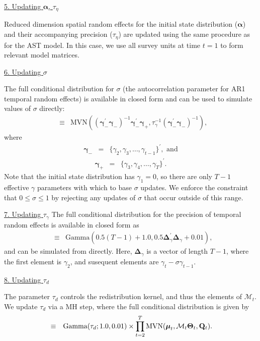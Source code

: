 \documentclass[12pt,fleqn]{article}
\begin{document}
\begin{flushleft}
\underline{5. Updating $\boldsymbol{\alpha}$, $\tau_\eta$}

Reduced dimension spatial random effects for the initial state distribution ($\boldsymbol{\alpha}$) and their accompanying precision ($\tau_\eta$) are updated using the same procedure as for the AST model.  In this case, we use all survey units at time $t=1$ to form relevant model matrices.

\underline{6. Updating $\sigma$}

The full conditional distribution for $\sigma$ (the autocorrelation parameter for AR1 temporal random effects) is available in closed form and can be used to simulate values of $\sigma$ directly:
\begin{eqnarray*}
  [\sigma | \cdot] & \equiv & \textrm{MVN}( (\boldsymbol{\gamma}_-^\prime \boldsymbol{\gamma}_-)^{-1} \boldsymbol{\gamma}_-^\prime \boldsymbol{\gamma}_+, \tau_\gamma^{-1} (\boldsymbol{\gamma}_-^\prime \boldsymbol{\gamma}_-)^{-1} ),
\end{eqnarray*}
where
\begin{eqnarray*}
   \boldsymbol{\gamma}_- & = & \{ \gamma_2, \gamma_3, \hdots, \gamma_{t-1} \}^\prime, \text{ and}
\end{eqnarray*}
\begin{eqnarray*}
   \boldsymbol{\gamma}_+ & = & \{ \gamma_3, \gamma_4, \hdots, \gamma_{T} \}^\prime.
\end{eqnarray*}
Note that the initial state distribution has $\gamma_1 = 0$, so there are only $T-1$ effective $\gamma$ parameters with which to base $\sigma$ updates. We enforce the constraint that $0 \le \sigma \le 1$ by rejecting any updates of $\sigma$ that occur outside of this range.

\underline{7. Updating $\tau_\gamma$}
The full conditional distribution for the precision of temporal random effects is available in closed form as
\begin{eqnarray*}
  [\tau_\gamma | \cdot] & \equiv & \textrm{Gamma}(0.5 (T-1) + 1.0,0.5 \boldsymbol{\Delta}_\gamma^\prime \boldsymbol{\Delta}_\gamma + 0.01),
\end{eqnarray*}
and can be simulated from directly.
 Here, $\boldsymbol{\Delta}_\gamma$ is a vector of length $T-1$, where the first element is $\gamma_2$, and susequent elements are $\gamma_{t}-\sigma \gamma_{t-1}$.


\underline{8.  Updating $\tau_d$}

The parameter $\tau_d$ controls the redistribution kernel, and thus the elements of $\mathcal{M}_t$.  We update
$\tau_d$ via a MH step, where the full conditional distribution is given by
\begin{eqnarray*}
  [\tau_d | \cdot] & \equiv & \textrm{Gamma}(\tau_d;1.0,0.01) \times  \prod_{t=2}^T \textrm{MVN}(\boldsymbol{\mu}_t, \mathcal{M}_t \boldsymbol{\Theta}_t,{\bf Q}_t).
\end{eqnarray*}



\end{flushleft}
\end{document}
